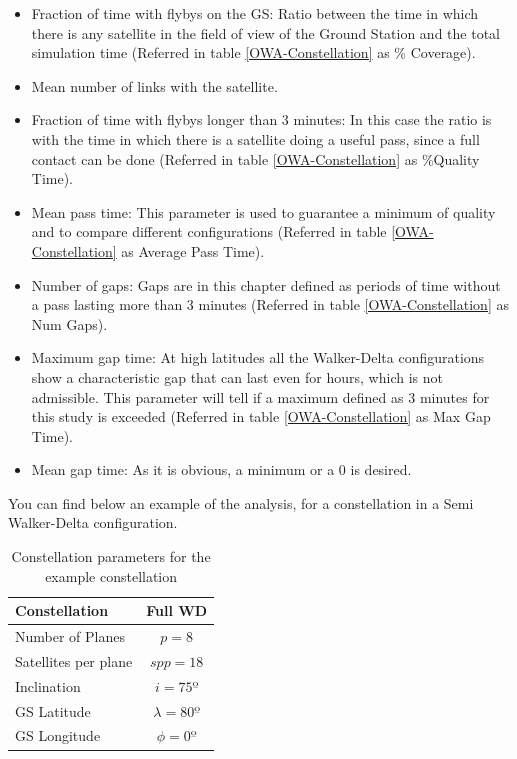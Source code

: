 \begin{itemize}
\item Fraction of time with flybys on the GS: Ratio between the time in which there is any satellite in the field of view of the Ground Station and the total simulation time (Referred in table \ref{OWA-Constellation} as \% Coverage).
\item Mean number of links with the satellite.
\item Fraction of time with flybys longer than 3 minutes: In this case the ratio is with the time in which there is a satellite doing a useful pass, since a full contact can be done (Referred in table \ref{OWA-Constellation} as \%Quality Time).
\item Mean pass time: This parameter is used to guarantee a minimum of quality and to compare different configurations (Referred in table \ref{OWA-Constellation} as Average Pass Time).
\item Number of gaps: Gaps are in this chapter defined as periods of time without a pass lasting more than 3 minutes (Referred in table \ref{OWA-Constellation} as Num Gaps).
\item Maximum gap time: At high latitudes all the Walker-Delta configurations show a characteristic gap that can last even for hours, which is not admissible. This parameter will tell if a maximum defined as 3 minutes for this study is exceeded (Referred in table \ref{OWA-Constellation} as Max Gap Time).
\item Mean gap time: As it is obvious, a minimum or a 0 is desired. 
\end{itemize}

You can find below an example of the analysis, for a constellation in a Semi Walker-Delta configuration.

\begin{table}[H]
\centering
\begin{tabular}{|l|c|}
\hline
Constellation & Full WD \\ \hline
Number of Planes     & $ p=8 $   \\ \hline
Satellites per plane   & $ spp=18 $ \\ \hline
Inclination  	 & $ i=75º $   \\ \hline
GS Latitude   & $ \lambda=80º$   \\ \hline
GS Longitude & $ \phi=0º $ \\ \hline
\end{tabular}
\caption{Constellation parameters for the example constellation}
\end{table}

